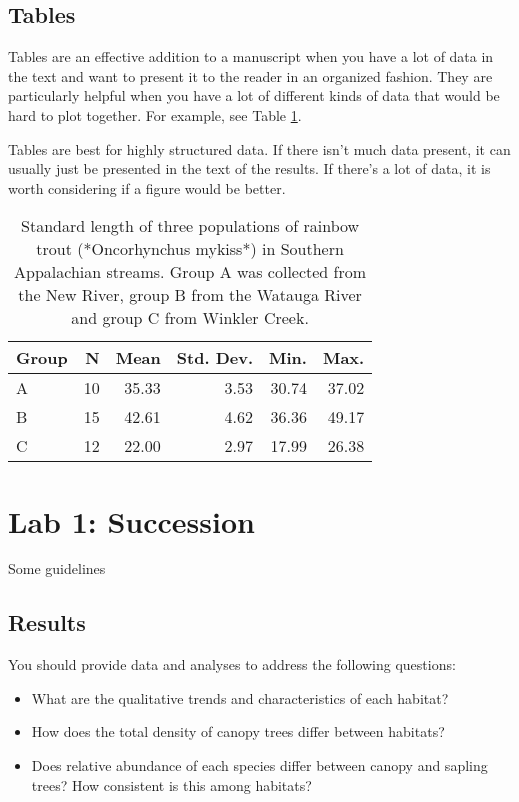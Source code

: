 \documentclass[]{book}
\providecommand{\tightlist}{%
  \setlength{\itemsep}{0pt}\setlength{\parskip}{0pt}}
\begin{document}
\section{Tables}\label{tables}

Tables are an effective addition to a manuscript when you have a lot of
data in the text and want to present it to the reader in an organized
fashion. They are particularly helpful when you have a lot of different
kinds of data that would be hard to plot together. For example, see
Table \ref{tab:table1}.

Tables are best for highly structured data. If there isn't much data
present, it can usually just be presented in the text of the results. If
there's a lot of data, it is worth considering if a figure would be
better.

\begin{table}

\caption{\label{tab:table1}Standard length of three populations of rainbow trout (*Oncorhynchus mykiss*) in Southern Appalachian streams.  Group A was collected from the New River, group B from the Watauga River and group C from Winkler Creek.}
\centering
\begin{tabular}[t]{lrrrrr}
\toprule
Group & N & Mean & Std. Dev. & Min. & Max.\\
\midrule
A & 10 & 35.33 & 3.53 & 30.74 & 37.02\\
B & 15 & 42.61 & 4.62 & 36.36 & 49.17\\
C & 12 & 22.00 & 2.97 & 17.99 & 26.38\\
\bottomrule
\end{tabular}
\end{table}

\chapter{Lab 1: Succession}\label{lab1}

Some guidelines

\section{Results}\label{results-2}

You should provide data and analyses to address the following questions:

\begin{itemize}
\tightlist
\item
  What are the qualitative trends and characteristics of each habitat?
\item
  How does the total density of canopy trees differ between habitats?
\item
  Does relative abundance of each species differ between canopy and
  sapling trees? How consistent is this among habitats?
\end{itemize}
\end{document}
